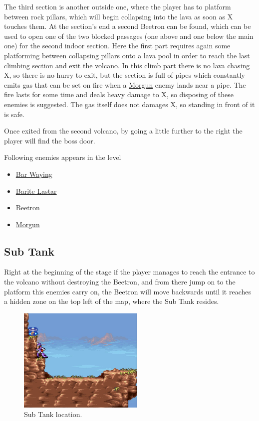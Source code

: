 The third section is another outside one, where the player has to platform between rock pillars, which will begin collapsing into the lava as soon as X touches them. At the section's end a second Beetron can be found, which can be used to open one of the two blocked passages (one above and one below the main one) for the second indoor section. Here the first part requires again some platforming between collapsing pillars onto a lava pool in order to reach the last climbing section and exit the volcano. In this climb part there is no lava chasing X, so there is no hurry to exit, but the section is full of pipes which constantly emits gas that can be set on fire when a \hyperlink{enem:Morgun}{Morgun} enemy lands near a pipe. The fire lasts for some time and deals heavy damage to X, so disposing of these enemies is suggested. The gas itself does not damages X, so standing in front of it is safe.

Once exited from the second volcano, by going a little further to the right the player will find the boss door.

Following enemies appears in the level~\cite{wiki:Volcanic_zone}
\begin{itemize}
	\item \hyperlink{enem:Bar_Waying}{Bar Waying}
	\item \hyperlink{enem:Barite_Lastar}{Barite Lastar}
	\item \hyperlink{enem:Beetron}{Beetron}
	\item \hyperlink{enem:Morgun}{Morgun}
\end{itemize}


\subsection{Sub Tank}
Right at the beginning of the stage if the player manages to reach the entrance to the volcano without destroying the Beetron, and from there jump on to the platform this enemies carry on, the Beetron will move backwards until it reaches a hidden zone on the top left of the map, where the Sub Tank resides. 
\begin{figure}[htp]
	\centering
	\includegraphics[height=5cm]{figures/X2/Flame_stag/Stag_tank.png}
	\caption{Sub Tank location.}
\end{figure}


